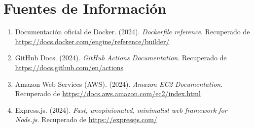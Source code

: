 \documentclass[12pt,a4paper]{article}
\begin{document}
\newpage

\section*{Fuentes de Información}
\begin{enumerate}
    \item Documentación oficial de Docker. (2024). \textit{Dockerfile reference}. Recuperado de \url{https://docs.docker.com/engine/reference/builder/}
    \item GitHub Docs. (2024). \textit{GitHub Actions Documentation}. Recuperado de \url{https://docs.github.com/en/actions}
    \item Amazon Web Services (AWS). (2024). \textit{Amazon EC2 Documentation}. Recuperado de \url{https://docs.aws.amazon.com/ec2/index.html}
    \item Express.js. (2024). \textit{Fast, unopinionated, minimalist web framework for Node.js}. Recuperado de \url{https://expressjs.com/}
\end{enumerate}
\end{document}
